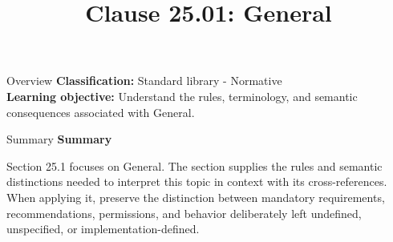 \documentclass[10pt,letterpaper]{article}
\title{Clause 25.01: General}
\author{}
\date{}
\begin{document}
\maketitle
\begin{CornellOverviewBox}{Overview}
\textbf{Classification:} Standard library - Normative\\[2pt]
\textbf{Learning objective:} Understand the rules, terminology, and semantic consequences associated with General.
\end{CornellOverviewBox}\begin{CornellSummaryBox}{Summary}
{\sffamily\bfseries\color{Accent} Summary}\par\vspace{3pt}Section 25.1 focuses on General. The section supplies the rules and semantic distinctions needed to interpret this topic in context with its cross-references. When applying it, preserve the distinction between mandatory requirements, recommendations, permissions, and behavior deliberately left undefined, unspecified, or implementation-defined.
\end{CornellSummaryBox}
\end{document}
